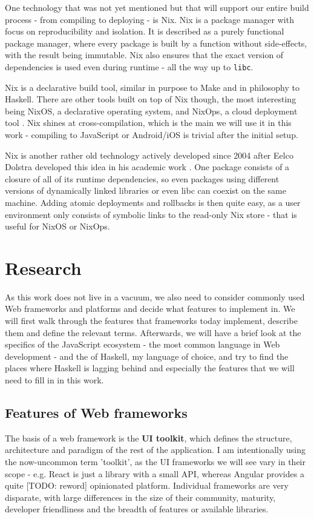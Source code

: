 \documentclass[english,odsaz]{fitthesis}
\begin{document}
One technology that was not yet mentioned but that will support our entire build
process - from compiling to deploying - is Nix. Nix \cite{dolstra2006purely} is a
package manager with focus on reproducibility and isolation. It is described as
a purely functional package manager, where every package is built by a function
without side-effects, with the result being immutable. Nix also ensures that the
exact version of dependencies is used even during runtime - all the way up to
\texttt{libc}.

Nix is a declarative build tool, similar in purpose to Make and in philosophy to
Haskell. There are other tools built on top of Nix though, the most interesting
being NixOS, a declarative operating system, and NixOps, a cloud deployment tool
\cite{dolstra2008nixos}. Nix shines at cross-compilation, which is the main we
will use it in this work - compiling to JavaScript or Android/iOS is trivial
after the initial setup.

Nix is another rather old technology actively developed since 2004 after Eelco
Dolstra developed this idea in his academic work \cite{dolstra2006purely}. One
package consists of a closure of all of its runtime dependencies, so even
packages using different versions of dynamically linked libraries or even libc
can coexist on the same machine. Adding atomic deployments and rollbacks is then
quite easy, as a user environment only consists of symbolic links to the
read-only Nix store - that is useful for NixOS or NixOps.

\chapter{Research}
\label{sec:orge1de391}
As this work does not live in a vacuum, we also need to consider commonly used
Web frameworks and platforms and decide what features to implement in. We will
first walk through the features that frameworks today implement, describe them
and define the relevant terms. Afterwards, we will have a brief look at the
specifics of the JavaScript ecosystem - the most common language in Web
development - and the of Haskell, my language of choice, and try to find the
places where Haskell is lagging behind and especially the features that we will
need to fill in in this work.

\section{Features of Web frameworks}
\label{sec:org1a00c5c}
The basis of a web framework is the \textbf{UI toolkit}, which defines the structure,
architecture and paradigm of the rest of the application. I am intentionally
using the now-uncommon term 'toolkit', as the UI frameworks we will see vary in
their scope - e.g. React is just a library with a small API, whereas Angular
provides a quite [TODO: reword] opinionated platform. Individual frameworks are
very disparate, with large differences in the size of their community, maturity,
developer friendliness and the breadth of features or available libraries.
\end{document}
